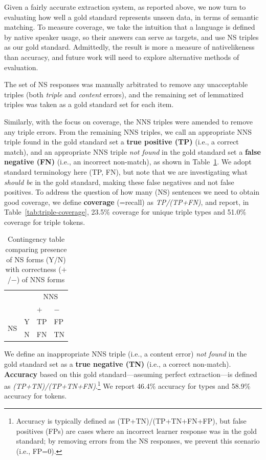 Given a fairly accurate extraction system, as reported above, we now
turn to evaluating how well a gold standard represents unseen data, in
terms of semantic matching.  To measure coverage, we take the
intuition that a language is defined by native speaker usage, so their
answers can serve as targets, and use NS triples as our gold standard. Admittedly, the result is more a measure of nativelikeness than accuracy, and future work will need to explore alternative methods of evaluation.

The set of NS responses was manually arbitrated to remove any
unacceptable triples (both \textit{triple} and \textit{content}
errors), and the remaining set of lemmatized triples was taken as a gold standard
set for each item.

Similarly, with the focus on coverage, the NNS triples were amended to
remove any triple errors.
From the remaining NNS triples, we call an appropriate NNS triple
found in the gold standard set a \textbf{true positive (TP)} (i.e., a
correct match), and an appropriate NNS triple \textit{not found} in
the gold standard set a \textbf{false negative (FN)} (i.e., an
incorrect non-match), as shown in Table~\ref{tab:contingencies}.  We
adopt standard terminology here (TP, FN), but note that we are
investigating what \emph{should be} in the gold standard, making these
false negatives and not false positives.  To address the question of
how many (NS) sentences we need to obtain good coverage, we define
\textbf{coverage} (=recall) as \textit{TP/(TP+FN)}, and report, in
Table~\ref{tab:triple-coverage}, 23.5\% coverage for unique triple
types and 51.0\% coverage for triple tokens.

\begin{table}[htb!]
\begin{center}
\begin{tabular}{|ll||l|l|}
  \hline
  & & \multicolumn{2}{c|}{NNS}\\
  & & $+$ & $-$ \\
  \hline
  \hline
  \multirow{2}{*}{NS} & Y & TP & FP \\
  \cline{2-4}
  & N & FN & TN\\
  \hline
\end{tabular}
\end{center}
\caption{Contingency table comparing presence of NS forms (Y/N) with
  correctness ($+$/$-$) of NNS forms}
\label{tab:contingencies}
\end{table}

We define an inappropriate NNS triple (i.e., a content error)
\textit{not found} in the gold standard set as a \textbf{true negative
  (TN)} (i.e., a correct non-match). \textbf{Accuracy} based on this
gold standard---assuming perfect extraction---is defined as
\textit{(TP+TN)/(TP+TN+FN)}.\footnote{Accuracy is typically defined as
  (TP+TN)/(TP+TN+FN+FP), but false positives (FPs) are cases where an
  incorrect learner response was in the gold standard; by removing errors from the NS responses, we prevent this scenario (i.e., FP=0).} We report 46.4\% accuracy for types and 58.9\% accuracy for tokens.

